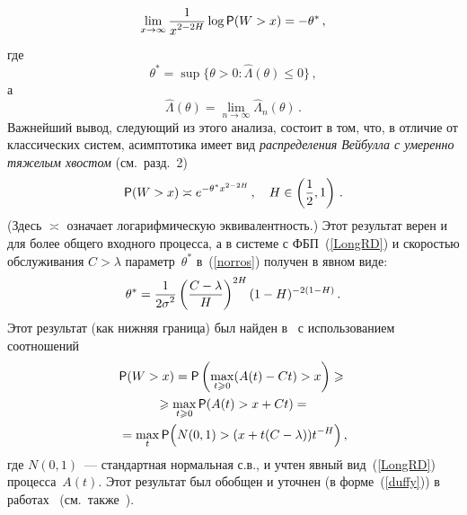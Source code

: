 \begin{multicols}{2}
\noindent
\begin{equation}
 \lim_{x \to \infty} \displaystyle\frac{\displaystyle 1\mathstrut}{\displaystyle x^{2-2H}\mathstrut}\log {\sf P}(W > x) = -\theta^*\,,
 \label{norros}
\end{equation}
где
$$%
\theta^* = \sup\{\theta > 0: \hat \Lambda(\theta)\le 0\}\,,
$$
а
$$\hat \Lambda (\theta)=\lim_{n\to \infty} \hat \Lambda_n (\theta)\,.
$$%
Важнейший вывод, следующий из этого анализа, состоит в том, что, в
отличие от классических сис\-тем, асимптотика имеет вид {\it
распределения Вейбулла с умеренно тяжелым хвостом} (см.\ разд.~2)
\begin{equation}
{\sf P} (W > x)\asymp e^{-\theta^* x^{2-2H}}\,,\quad H\in\left(\displaystyle\frac{\displaystyle 1\mathstrut}{\displaystyle 2\mathstrut},1\right)\,.
\label{duffy}
\end{equation}
(Здесь $\asymp$ означает логарифмическую эквивалентность.) Этот
результат верен и для более общего входного процесса, а в системе с
ФБП~(\ref{LongRD}) и скоростью обслуживания $C>\lambda$ параметр~$\theta^*$ в~(\ref{norros}) получен в явном виде:
\begin{equation}
 \theta^*=\displaystyle\frac{\displaystyle 1\mathstrut}{\displaystyle 2\sigma^2\mathstrut}\left(\displaystyle\frac{\displaystyle C-\lambda\mathstrut}{\displaystyle H\mathstrut}\right)^{2H}(1-H)^{-2(1-H)}\,.
 \label{ilkka}
\end{equation}
Этот результат (как нижняя граница) был найден в~\cite {Norros} с использованием соотношений
\begin{multline*}
{\sf P}(W>x)={\sf P}\left(\max_{t\geqslant 0}(A(t)-Ct)> x\right)\geqslant {}\\
{}\geqslant
\max_{t\geqslant 0}{\sf P}(A(t)> x+Ct)={}\\
{}=\max_t{\sf P}\Bigl(N(0,1)>(x+t(C-\lambda))t^{-H}\Bigr)\,,
\end{multline*}
где $N(0,1)$~--- стандартная нормальная с.в., и учтен явный вид~(\ref{LongRD}) процесса~$A(t)$.
Этот результат был обобщен и уточнен (в форме~(\ref{duffy})) в работах~\cite {Duff-Connell, Duffy} (см.\
также~\cite {Kelly}).


\end{multicols}
